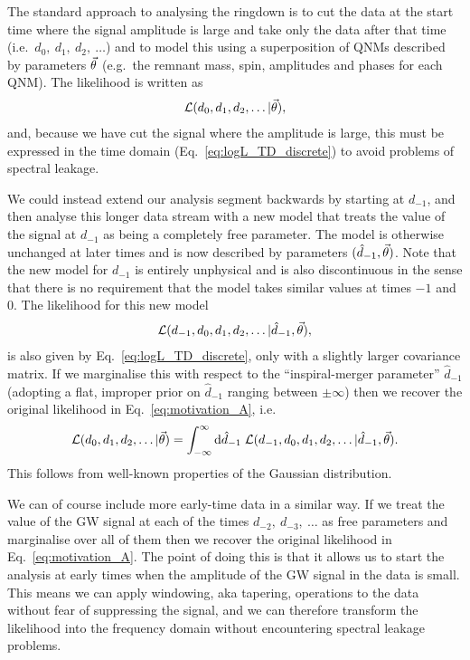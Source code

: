 The standard approach to analysing the ringdown is to cut the data at the start time where the signal amplitude is large and take only the data after that time (i.e.\ $d_{0},\ d_{1},\ d_{2},\ \ldots$) and to model this using a superposition of QNMs described by parameters $\vec{\theta}$ (e.g.\ the remnant mass, spin, amplitudes and phases for each QNM).
The likelihood is written as
\begin{align} \label{eq:motivation_A}
	\mathcal{L}(d_{0}, d_{1}, d_{2}, \ldots|\vec{\theta}),
\end{align}
and, because we have cut the signal where the amplitude is large, this must be expressed in the time domain (Eq.~\ref{eq:logL_TD_discrete}) to avoid problems of spectral leakage.

We could instead extend our analysis segment backwards by starting at $d_{-1}$, and then analyse this longer data stream with a new model that treats the value of the signal at $d_{-1}$ as being a completely free parameter. 
The model is otherwise unchanged at later times and is now described by parameters $(\hat{d}_{-1}, \vec{\theta})$.
Note that the new model for $d_{-1}$ is entirely unphysical and is also discontinuous in the sense that there is no requirement that the model takes similar values at times $-1$ and 0.
The likelihood for this new model
\begin{align} \label{eq:motivation_B}
	\mathcal{L}(d_{-1}, d_{0}, d_{1}, d_{2}, \ldots|\hat{d}_{-1}, \vec{\theta}),
\end{align} 
is also given by Eq.~\ref{eq:logL_TD_discrete}, only with a slightly larger covariance matrix.
If we marginalise this with respect to the ``inspiral-merger parameter'' $\hat{d}_{-1}$ 
(adopting a flat, improper prior on $\hat{d}_{-1}$ ranging between $\pm\infty$)
then we recover the original likelihood in Eq.~\ref{eq:motivation_A}, i.e.\
\begin{equation} \label{eq:motivation_C}
    \mathcal{L}(d_{0}, d_{1}, d_{2}, \ldots|\vec{\theta}) = \int_{-\infty}^{\infty} \mathrm{d}\hat{d}_{-1}\; \mathcal{L}(d_{-1}, d_{0}, d_{1}, d_{2}, \ldots|\hat{d}_{-1}, \vec{\theta}).
\end{equation}
This follows from well-known properties of the Gaussian distribution.

We can of course include more early-time data in a similar way. 
If we treat the value of the GW signal at each of the times $d_{-2},\ d_{-3},\ \ldots$ as free parameters and marginalise over all of them then we recover the original likelihood in Eq.~\ref{eq:motivation_A}.
The point of doing this is that it allows us to start the analysis at early times when the amplitude of the GW signal in the data is small.
This means we can apply windowing, aka tapering, operations to the data without fear of suppressing the signal, and we can therefore transform the likelihood into the frequency domain without encountering spectral leakage problems.

